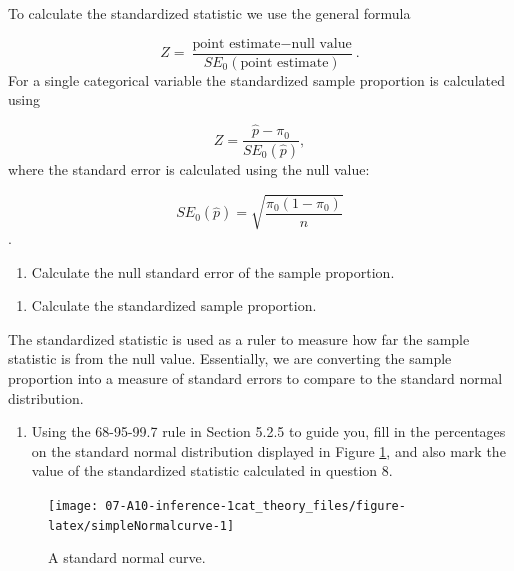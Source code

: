 \documentclass[
]{report}
\providecommand{\tightlist}{%
  \setlength{\itemsep}{0pt}\setlength{\parskip}{0pt}}
\begin{document}
\vspace{1in}
\newpage

To calculate the standardized statistic we use the general formula

\[
Z = \frac{\text{point estimate} - \text{null value}}{SE_0(\text{point estimate})}.
\]
For a single categorical variable the standardized sample proportion is calculated using

\[
Z = \frac{\hat{p} - \pi_0}{SE_0(\hat{p})},
\]
where the standard error is calculated using the null value:

\[SE_0(\hat{p})=\sqrt{\frac{\pi_0(1-\pi_0)}{n}}\].

\begin{enumerate}
\def\labelenumi{\arabic{enumi}.}
\setcounter{enumi}{6}
\tightlist
\item
  Calculate the null standard error of the sample proportion.
\end{enumerate}

\vspace{0.6in}

\begin{enumerate}
\def\labelenumi{\arabic{enumi}.}
\setcounter{enumi}{7}
\tightlist
\item
  Calculate the standardized sample proportion.
\end{enumerate}

\vspace{0.6in}

The standardized statistic is used as a ruler to measure how far the sample statistic is from the null value. Essentially, we are converting the sample proportion into a measure of standard errors to compare to the standard normal distribution.

\begin{enumerate}
\def\labelenumi{\arabic{enumi}.}
\setcounter{enumi}{8}
\tightlist
\item
  Using the 68-95-99.7 rule in Section 5.2.5 to guide you, fill in the percentages on the standard normal distribution displayed in Figure \ref{fig:simpleNormalcurve}, and also mark the value of the standardized statistic calculated in question 8.
\end{enumerate}

\begin{figure}

{\centering \texttt{[image: 07-A10-inference-1cat\_theory\_files/figure-latex/simpleNormalcurve-1]} 

}

\caption{A standard normal curve.}\label{fig:simpleNormalcurve}
\end{figure}
\end{document}
